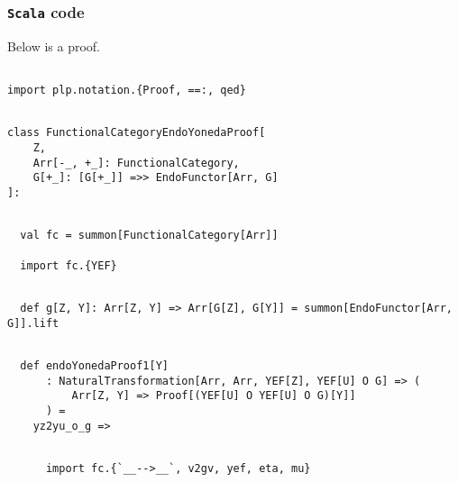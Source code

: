 \documentclass[11pt]{article}
\newcommand{\code}{\subsubsection{{\tt Scala} code}\begingroup\rm \vspace{12pt}}
\begin{document}
\code
Below is a proof.

\vspace{6pt}
\begin{mdframed}[backgroundcolor=lightgray!20] 
\begin{lstlisting}

import plp.notation.{Proof, ==:, qed}
\end{lstlisting}
\end{mdframed}
\vspace{6pt}
\begin{mdframed}[backgroundcolor=lightgray!20] 
\begin{lstlisting}

class FunctionalCategoryEndoYonedaProof[
    Z,
    Arr[-_, +_]: FunctionalCategory,
    G[+_]: [G[+_]] =>> EndoFunctor[Arr, G]
]:

\end{lstlisting}
\end{mdframed}
\vspace{6pt}
\begin{mdframed}[backgroundcolor=lightgray!20] 
\begin{lstlisting}

  val fc = summon[FunctionalCategory[Arr]]

  import fc.{YEF}
\end{lstlisting}
\end{mdframed}
\vspace{6pt}
\begin{mdframed}[backgroundcolor=lightgray!20] 
\begin{lstlisting}

  def g[Z, Y]: Arr[Z, Y] => Arr[G[Z], G[Y]] = summon[EndoFunctor[Arr, G]].lift

\end{lstlisting}
\end{mdframed}
\vspace{6pt}
\begin{mdframed}[backgroundcolor=lightgray!20] 
\begin{lstlisting}

  def endoYonedaProof1[Y]
      : NaturalTransformation[Arr, Arr, YEF[Z], YEF[U] O G] => (
          Arr[Z, Y] => Proof[(YEF[U] O YEF[U] O G)[Y]]
      ) =
    yz2yu_o_g =>
\end{lstlisting}
\end{mdframed}
\vspace{6pt}
\begin{mdframed}[backgroundcolor=lightgray!20] 
\begin{lstlisting}

      import fc.{`__-->__`, v2gv, yef, eta, mu}
\end{lstlisting}
\end{mdframed}
\end{document}
